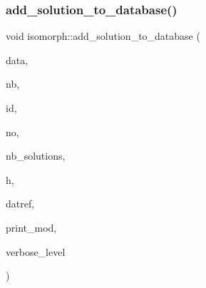 \subsubsection{\texorpdfstring{add\+\_\+solution\+\_\+to\+\_\+database()}{add\_solution\_to\_database()}}
{\footnotesize\ttfamily void isomorph\+::add\+\_\+solution\+\_\+to\+\_\+database (\begin{DoxyParamCaption}\item[{\mbox{\hyperlink{galois_8h_a09fddde158a3a20bd2dcadb609de11dc}{I\+NT}} $\ast$}]{data,  }\item[{\mbox{\hyperlink{galois_8h_a09fddde158a3a20bd2dcadb609de11dc}{I\+NT}}}]{nb,  }\item[{\mbox{\hyperlink{galois_8h_a09fddde158a3a20bd2dcadb609de11dc}{I\+NT}}}]{id,  }\item[{\mbox{\hyperlink{galois_8h_a09fddde158a3a20bd2dcadb609de11dc}{I\+NT}}}]{no,  }\item[{\mbox{\hyperlink{galois_8h_a09fddde158a3a20bd2dcadb609de11dc}{I\+NT}}}]{nb\+\_\+solutions,  }\item[{\mbox{\hyperlink{galois_8h_a09fddde158a3a20bd2dcadb609de11dc}{I\+NT}}}]{h,  }\item[{\mbox{\hyperlink{galois_8h_ac94af6544c710549c9fca744fd510395}{U\+I\+N\+T4}} \&}]{datref,  }\item[{\mbox{\hyperlink{galois_8h_a09fddde158a3a20bd2dcadb609de11dc}{I\+NT}}}]{print\+\_\+mod,  }\item[{\mbox{\hyperlink{galois_8h_a09fddde158a3a20bd2dcadb609de11dc}{I\+NT}}}]{verbose\+\_\+level }\end{DoxyParamCaption})}

\mbox{\label{classisomorph_afe502608a65808a0daf63ac05c860e62}} 
